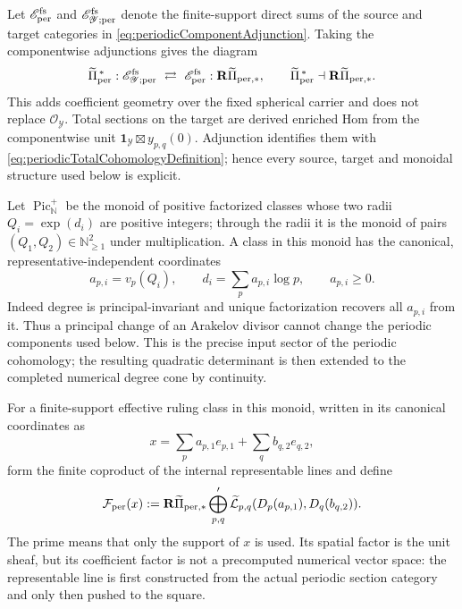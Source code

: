 \documentclass[11pt]{amsart}
\theoremstyle{definition}
\theoremstyle{remark}
\newcommand{\N}{\mathbb N}
\newcommand{\Pic}{\operatorname{Pic}}
\begin{document}
Let $\mathscr E_{\rm per}^{\rm fs}$ and
$\mathscr E_{\mathscr Y;\rm per}^{\rm fs}$ denote the finite-support direct
sums of the source and target categories in
\eqref{eq:periodicComponentAdjunction}.  Taking the componentwise adjunctions
gives the diagram
\begin{equation}\label{eq:periodicCoefficientProjection}
 \widetilde\Pi_{\rm per}^{\,*}:
 \mathscr E_{\mathscr Y;\rm per}^{\rm fs}
 \ \rightleftarrows\
 \mathscr E_{\rm per}^{\rm fs}:
 \mathbf R\widetilde\Pi_{{\rm per},*},
 \qquad
 \widetilde\Pi_{\rm per}^{\,*}\dashv
 \mathbf R\widetilde\Pi_{{\rm per},*}.
\end{equation}
This adds coefficient geometry over the fixed spherical carrier and does
not replace $\mathcal O_{\mathscr Y}$.  Total sections on the target are
derived enriched Hom from the componentwise unit
$\mathbf1_{\mathscr Y}\boxtimes y_{p,q}(0)$.  Adjunction identifies them
with \eqref{eq:periodicTotalCohomologyDefinition}; hence every source,
target and monoidal structure used below is explicit.

Let $\Pic_{\mathbb N}^{+}$ be the monoid of
positive factorized classes whose two radii
$Q_i=\exp(d_i)$ are positive integers; through the radii it is the monoid
of pairs $(Q_1,Q_2)\in\N_{\ge1}^2$ under multiplication.  A class in this monoid has the
canonical, representative-independent coordinates
\begin{equation}\label{eq:canonicalPrimeCoordinates}
 a_{p,i}=v_p(Q_i),\qquad
 d_i=\sum_p a_{p,i}\log p,\qquad a_{p,i}\geq0.
\end{equation}
Indeed degree is principal-invariant and unique factorization recovers all
$a_{p,i}$ from it.  Thus a principal change of an Arakelov divisor cannot
change the periodic components used below.  This is the precise input
sector of the periodic cohomology; the resulting quadratic determinant is
then extended to the completed numerical degree cone by continuity.

For a finite-support effective ruling class in this monoid, written in its
canonical coordinates as
\[
 x=\sum_p a_{p,1}e_{p,1}+\sum_qb_{q,2}e_{q,2},
\]
form the finite coproduct of the internal representable lines and define
\begin{equation}\label{eq:intrinsicCoefficientObject}
 \mathcal F_{\rm per}(x)
 :=\mathbf R\widetilde\Pi_{{\rm per},*}
    \bigoplus_{p,q}'\widetilde{\mathcal L}_{p,q}
          (D_p(a_{p,1}),D_q(b_{q,2})).
\end{equation}
The prime means that only the support of $x$ is used.  Its spatial factor is
the unit sheaf, but its coefficient factor is not a precomputed numerical
vector space: the representable line is first constructed from the actual
periodic section category and only then pushed to the square.
\end{document}
